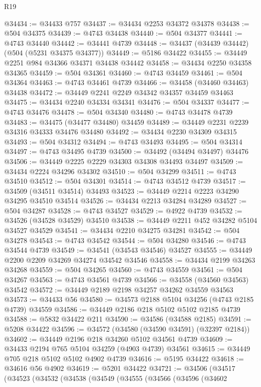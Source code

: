 \begin{lexlean}{R19}
\begin{coremodule}
{{{{{{{{{{{@34434 := @34433 @757
@34437 := @34434 @2253 @34372 @34378
@34438 := @504 @34375
@34439 := @4743 @34438
@34440 := @504 @34377
@34441 := @4743 @34440
@34442 := @34441 @4739
@34448 := @34437 (@34439 @34442) (@504 (@5231 @34375 @34377))
@34449 := @5186 @34422
@34455 := @34449 @2251 @984 @34366 @34371 @34438 @34442
@34458 := @34434 @2250 @34358 @34365
@34459 := @504 @34361
@34460 := @4743 @34459
@34461 := @504 @34364
@34463 := @4743 @34461 @4739
@34466 := @34458 (@34460 @34463) @34438
@34472 := @34449 @2241 @2249 @34342 @34357 @34459 @34463
@34475 := @34434 @2240 @34334 @34341
@34476 := @504 @34337
@34477 := @4743 @34476
@34478 := @504 @34340
@34480 := @4743 @34478 @4739
@34483 := @34475 (@34477 @34480) @34459
@34489 := @34449 @2231 @2239 @34316 @34333 @34476 @34480
@34492 := @34434 @2230 @34309 @34315
@34493 := @504 @34312
@34494 := @4743 @34493
@34495 := @504 @34314
@34497 := @4743 @34495 @4739
@34500 := @34492 (@34494 @34497) @34476
@34506 := @34449 @2225 @2229 @34303 @34308 @34493 @34497
@34509 := @34434 @2224 @34296 @34302
@34510 := @504 @34299
@34511 := @4743 @34510
@34512 := @504 @34301
@34514 := @4743 @34512 @4739
@34517 := @34509 (@34511 @34514) @34493
@34523 := @34449 @2214 @2223 @34290 @34295 @34510 @34514
@34526 := @34434 @2213 @34284 @34289
@34527 := @504 @34287
@34528 := @4743 @34527
@34529 := @4922 @4739
@34532 := @34526 (@34528 @34529) @34510
@34538 := @34449 @2211 @452 @34282 @5104 @34527 @34529
@34541 := @34434 @2210 @34275 @34281
@34542 := @504 @34278
@34543 := @4743 @34542
@34544 := @504 @34280
@34546 := @4743 @34544 @4739
@34549 := @34541 (@34543 @34546) @34527
@34555 := @34449 @2200 @2209 @34269 @34274 @34542 @34546
@34558 := @34434 @2199 @34263 @34268
@34559 := @504 @34265
@34560 := @4743 @34559
@34561 := @504 @34267
@34563 := @4743 @34561 @4739
@34566 := @34558 (@34560 @34563) @34542
@34572 := @34449 @2189 @2198 @34257 @34262 @34559 @34563
@34573 := @34433 @56
@34580 := @34573 @2188 @5104 @34256 (@4743 @2185 @4739) @34559
@34586 := @34449 @2186 @218 @5102 @5102 @2185 @4739
@34588 := @5832 @34422 @211
@34590 := @34586 (@34588 @2185)
@34591 := @5208 @34422
@34596 := @34572 (@34580 (@34590 @34591) (@32397 @2184))
@34602 := @34449 @2196 @218 @34260 @5102 @34561 @4739
@34609 := @34433 @2194 @765 @5104 @34259 (@4903 @4739) @34561
@34615 := @34449 @705 @218 @5102 @5102 @4902 @4739
@34616 := @5195 @34422
@34618 := @34616 @56 @4902
@34619 := @5201 @34422
@34721 := @34506
    (@34517
      (@34523
        (@34532
          (@34538
            (@34549
              (@34555
                (@34566
                  (@34596
                    (@34602
}}}}}}}}}}}
\end{coremodule}
\end{lexlean}
